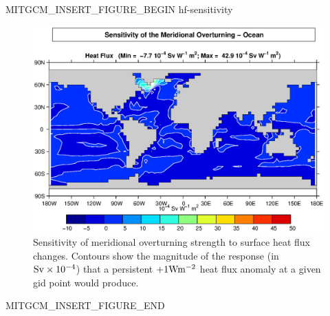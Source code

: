 \begin{rawhtml}MITGCM_INSERT_FIGURE_BEGIN hf-sensitivity\end{rawhtml}
\begin{figure}
  \begin{center}
   \includegraphics*[width=\textwidth,trim=0 0 0 40]{s_overview/figs/adj_hf_ocean.eps}
  \end{center}
\caption{Sensitivity of meridional overturning strength to surface heat flux
changes. Contours show the magnitude of the response (in ${\rm Sv }\times 10^{-4}$) that a persistent
$+1{\rm W}{\rm m}^{-2}$ heat flux anomaly at a given gid point would
produce.}
\label{fig:hf-sensitivity}
\end{figure}
\begin{rawhtml}MITGCM_INSERT_FIGURE_END\end{rawhtml}
